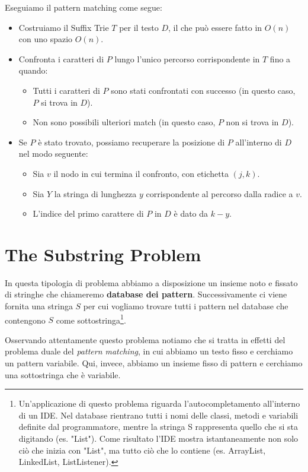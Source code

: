 \noindent
Eseguiamo il pattern matching come segue:
\begin{itemize}
    \item Costruiamo il Suffix Trie $T$ per il testo $D$, il che può essere fatto in $O(n)$ con uno spazio $O(n)$.
    \item Confronta i caratteri di $P$ lungo l'unico percorso corrispondente in $T$ fino a quando:
    \begin{itemize}
        \item Tutti i caratteri di $P$ sono stati confrontati con successo (in questo caso, $P$ si trova in $D$).
        \item Non sono possibili ulteriori match (in questo caso, $P$ non si trova in $D$).
    \end{itemize}
    \item Se $P$ è stato trovato, possiamo recuperare la posizione di $P$ all'interno di $D$ nel modo seguente: 
    \begin{itemize}
        \item Sia $v$ il nodo in cui termina il confronto, con etichetta $(j, k)$.
        \item Sia $Y$ la stringa di lunghezza $y$ corrispondente al percorso dalla radice a $v$.
        \item L'indice del primo carattere di $P$ in $D$ è dato da $k - y$.
    \end{itemize}
\end{itemize}


\clearpage
\section{The Substring Problem}
In questa tipologia di problema abbiamo a disposizione un insieme noto e fissato di stringhe che chiameremo \textbf{database dei pattern}. Successivamente ci viene fornita una stringa $S$ per cui vogliamo trovare tutti i pattern nel database che contengono $S$ come sottostringa\footnote{
    Un'applicazione di questo problema riguarda l'autocompletamento all'interno di un IDE. Nel database rientrano tutti i nomi delle classi, metodi e variabili definite dal programmatore, mentre la stringa S rappresenta quello che si sta digitando (es. "List"). Come risultato l'IDE mostra istantaneamente non solo ciò che inizia con "List", ma tutto ciò che lo contiene (es. ArrayList, LinkedList, ListListener).
}. 

Osservando attentamente questo problema notiamo che si tratta in effetti del problema duale del \emph{pattern matching}, in cui abbiamo un testo fisso e cerchiamo un pattern variabile. Qui, invece, abbiamo un insieme fisso di pattern e cerchiamo una sottostringa che è variabile.

